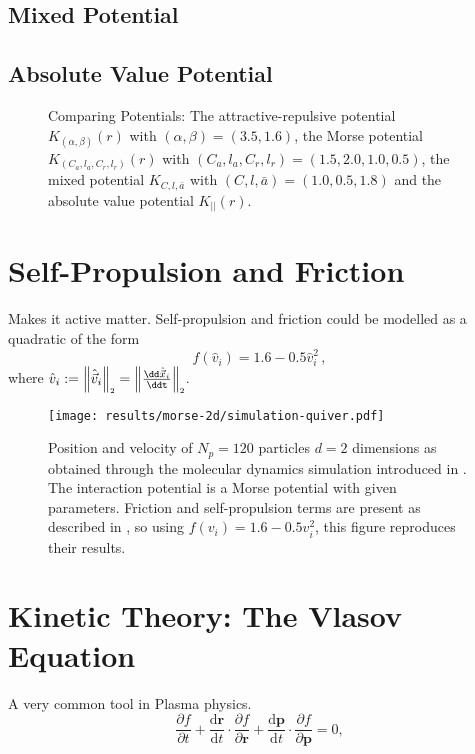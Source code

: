 \subsection{Mixed Potential}
\subsection{Absolute Value Potential}

\begin{figure}[H]
  \centering
  \caption[Comparing potentials]{Comparing Potentials: The attractive-repulsive potential $K_{(\alpha,\beta)}(r)$ with $(\alpha,\beta) = (3.5, 1.6)$, the Morse potential $K_{(C_a, l_a, C_r, l_r)}(r)$ with $(C_a, l_a, C_r, l_r) = (1.5, 2.0, 1.0, 0.5)$, the mixed potential $K_{C, l, \bar{a}}$ with $(C, l, \bar{a}) = (1.0, 0.5, 1.8)$ and the absolute value potential $K_{||}(r)$.}
  \label{fig:comparing-potentials}
\end{figure}

\section{Self-Propulsion and Friction}
Makes it active matter.
Self-propulsion and friction could be modelled as a quadratic of the form
$$f(\hat{v}_i) = 1.6 - 0.5 \hat{v}_i^2\,,$$
where $\hat{v}_i := \norm{\hatvec{v}_i} = \norm{\frac{\dd\hatvec{x}_i}{\ddt}}$.

\hierKoennteIhreWerbungStehen

\begin{figure}[H]
  \centering
  \texttt{[image: results/morse-2d/simulation-quiver.pdf]}
  \caption[Quiver plot of 120 particles in 2D interacting through the Morse potential]{Position and velocity of $N_p = 120$ particles $d = 2$ dimensions as obtained through the molecular dynamics simulation introduced in . The interaction potential is a Morse potential with given parameters. Friction and self-propulsion terms are present as described in \cite{2006-self-propelled}, so using $f(v_i) = 1.6 - 0.5 v_i^2$, this figure reproduces their results.}
  \label{fig:simulation-quiver-illustration}
\end{figure}


\section{Kinetic Theory: The Vlasov Equation}
A very common tool in Plasma physics.
$$\frac{\partial f}{\partial t}+{\frac {\mathrm {d} \mathbf {r} }{\mathrm {d} t}}\cdot {\frac {\partial f}{\partial \mathbf {r} }}+{\frac {\mathrm {d} \mathbf {p} }{\mathrm {d} t}}\cdot {\frac {\partial f}{\partial \mathbf {p} }}=0,$$

